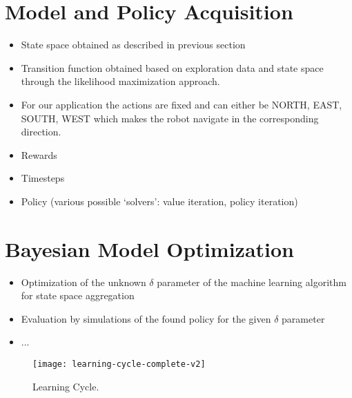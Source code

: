 \section{Model and Policy Acquisition}
\label{sec:model-policy-acquisition}

% 

\begin{itemize}
	\item State space obtained as described in previous section
	\item Transition function obtained based on exploration data and state space through the likelihood maximization approach.
	\item For our application the actions are fixed and can either be \textsc{NORTH}, \textsc{EAST}, \textsc{SOUTH}, \textsc{WEST} which makes the robot navigate in the corresponding direction.
	\item Rewards
	\item Timesteps
	\item Policy (various possible `solvers': value iteration, policy iteration)
\end{itemize}

\section{Bayesian Model Optimization}
\label{sec:bayesian-model-optimization}

% 

\begin{itemize}
	\item Optimization of the unknown $\delta$ parameter of the machine learning algorithm for state space aggregation
	\item Evaluation by simulations of the found policy for the given $\delta$ parameter
	\item ...
\end{itemize}

\begin{figure}[t]
	\centering
	\texttt{[image: learning-cycle-complete-v2]}
	\caption{Learning Cycle.}
	\label{fig:learning-cycle-complete}
\end{figure}
